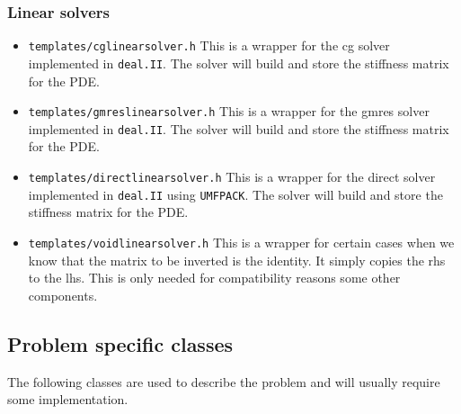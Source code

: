 \documentclass[prodmode,acmtoms]{acmsmall}
\numberwithin{equation}{section}
\begin{document}
\subsubsection{Linear solvers}
\begin{itemize}
\item \texttt{templates/cglinearsolver.h} This is a wrapper for the cg solver implemented in 
  \texttt{deal.II}. The solver will build and store the stiffness matrix for the PDE.
\item \texttt{templates/gmreslinearsolver.h} This is a wrapper for the gmres solver 
  implemented in \texttt{deal.II}. The solver will build and store the stiffness matrix 
  for the PDE.
\item \texttt{templates/directlinearsolver.h} This is a wrapper for the direct solver 
  implemented in \texttt{deal.II} using \texttt{UMFPACK}. 
  The solver will build and store the stiffness matrix for the PDE.
\item \texttt{templates/voidlinearsolver.h} This is a wrapper for certain cases when we 
  know that the matrix to be inverted is the identity. It simply copies the rhs to the
  lhs. This is only needed for compatibility reasons some other components.
\end{itemize}



\subsection{Problem specific classes}
The following classes are used to describe the problem and will usually require 
some implementation.
\end{document}
